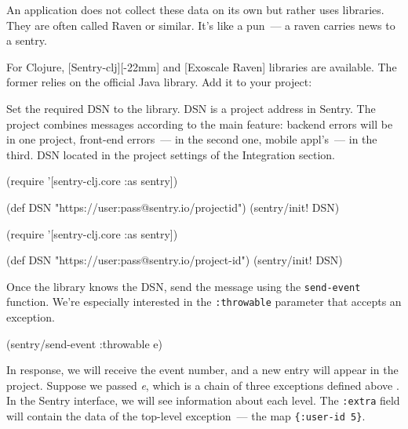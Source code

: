 
An application does not collect these data on its own but rather uses libraries. They are often called Raven or similar. It's like a pun~--- a raven carries news to a sentry.

For Clojure, [Sentry-clj][-22mm] and [Exoscale Raven] libraries are available. The former relies on the official Java library. Add it to your project:

\begin{clojure}
\end{clojure}


Set the required DSN to the library. DSN is a project address in Sentry. The project combines messages according to the main feature: backend errors will be in one project, front-end errors~--- in the second one, mobile appl's~--- in the third. DSN located in the project settings of the Integration section.

\ifnarrow

\begin{clojure}
(require '[sentry-clj.core :as sentry])

(def DSN
 "https://user:pass@sentry.io/projectid")
(sentry/init! DSN)
\end{clojure}

\else

\begin{clojure}
(require '[sentry-clj.core :as sentry])

(def DSN "https://user:pass@sentry.io/project-id")
(sentry/init! DSN)
\end{clojure}

\fi

Once the library knows the DSN, send the message using the \verb|send-event| function. We're especially interested in the \verb|:throwable| parameter that accepts an exception.

\begin{clojure}
(sentry/send-event {:throwable e})
\end{clojure}

In response, we will receive the event number, and a new entry will appear in the project. Suppose we passed \emph{e}, which is a chain of three exceptions defined above . In the Sentry interface, we will see information about each level. The \verb|:extra| field will contain the data of the top-level exception~--- the map \verb|{:user-id 5}|.

